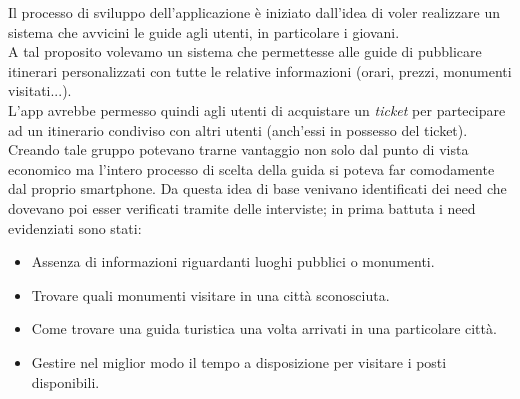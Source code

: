Il processo di sviluppo dell'applicazione è iniziato dall'idea di voler realizzare un sistema che avvicini le guide agli utenti, in particolare i giovani.\\
A tal proposito volevamo un sistema che permettesse alle guide di pubblicare itinerari personalizzati con tutte le relative informazioni (orari, prezzi, monumenti visitati...).\\
L'app avrebbe permesso quindi agli utenti di acquistare un \emph{ticket} per partecipare ad un itinerario condiviso con altri utenti (anch'essi in possesso del ticket). Creando tale gruppo potevano trarne vantaggio non solo dal punto di vista economico ma l'intero processo di scelta della guida si poteva far comodamente dal proprio smartphone.
Da questa idea di base venivano identificati dei need che dovevano poi esser verificati tramite delle interviste; in prima battuta i need evidenziati sono stati:
\begin{itemize}
	\item Assenza di informazioni riguardanti luoghi pubblici o monumenti.
	\item Trovare quali monumenti visitare in una città sconosciuta.
	\item Come trovare una guida turistica una volta arrivati in una particolare città.
	\item Gestire nel miglior modo il tempo a disposizione per visitare i posti disponibili.
	
\end{itemize}
